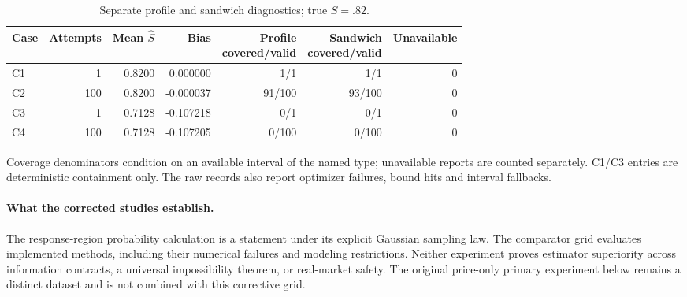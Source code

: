 \begin{table}[htbp]\centering\small
\caption{Separate profile and sandwich diagnostics; true $S=.82$.}
\label{tab:output_error_diagnostic}
\begin{tabular*}{\textwidth}{@{\extracolsep{\fill}}lrrrrrr@{}}
\toprule
Case & Attempts & Mean $\hat S$ & Bias & \shortstack{Profile\\covered/valid} & \shortstack{Sandwich\\covered/valid} & Unavailable \\
\midrule
C1 & 1 & 0.8200 & 0.000000 & 1/1 & 1/1 & 0 \\
C2 & 100 & 0.8200 & -0.000037 & 91/100 & 93/100 & 0 \\
C3 & 1 & 0.7128 & -0.107218 & 0/1 & 0/1 & 0 \\
C4 & 100 & 0.7128 & -0.107205 & 0/100 & 0/100 & 0 \\
\bottomrule\end{tabular*}
\par\smallskip\begin{minipage}{\textwidth}\footnotesize Coverage denominators condition on an available interval of the named type; unavailable reports are counted separately. C1/C3 entries are deterministic containment only. The raw records also report optimizer failures, bound hits and interval fallbacks.\end{minipage}
\end{table}

\paragraph{What the corrected studies establish.}
The response-region probability calculation is a statement under its explicit
Gaussian sampling law. The comparator grid evaluates implemented methods,
including their numerical failures and modeling restrictions. Neither
experiment proves estimator superiority across information contracts, a
universal impossibility theorem, or real-market safety. The original
price-only primary experiment below remains a distinct dataset and is not
combined with this corrective grid.
